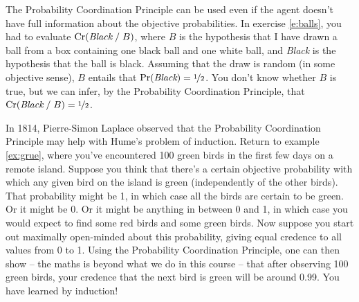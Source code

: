 The Probability Coordination Principle can be used even if the agent doesn't
have full information about the objective probabilities. In exercise
\ref{e:balls}, you had to evaluate $\text{Cr}(\emph{Black}\;/\;B)$, where $B$ is the
hypothesis that I have drawn a ball from a box containing one black ball and one
white ball, and \emph{Black} is the hypothesis that the ball is black. Assuming
that the draw is random (in some objective sense), $B$ entails that
$\text{Pr}(\emph{Black}) = \nicefrac{1}{2}$. You don't know whether $B$ is true,
but we can infer, by the Probability Coordination Principle, that
$\text{Cr}(\emph{Black} \;/\; B) = \nicefrac{1}{2}$.


In 1814, Pierre-Simon Laplace observed that the Probability Coordination
Principle may help with Hume's problem of induction. Return to example
\ref{ex:grue}, where you've encountered 100 green birds in the first few days on
a remote island. Suppose you think that there's a certain objective
  probability with which any given bird on the island is green (independently
of the other birds). That probability might be 1, in which case all the birds
are certain to be green. Or it might be 0. Or it might be anything in between 0
and 1, in which case you would expect to find some red birds and some green
birds. Now suppose you start out maximally open-minded about this probability,
giving equal credence to all values from 0 to 1. Using the Probability
Coordination Principle, one can then show -- the maths is beyond what we do in
this course -- that after observing 100 green birds, your credence that the next
bird is green will be around 0.99. You have learned by induction!

